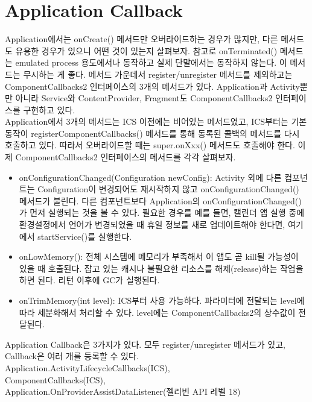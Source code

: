 \section{Application Callback}
Application에서는 onCreate() 메서드만 오버라이드하는 경우가 많지만,  
다른 메서드도 유용한 경우가 있으니 어떤 것이 있는지 살펴보자. 
참고로 onTerminated() 메서드는 emulated process 용도에서나 동작하고 실제 단말에서는 동작하지 않는다. 이 메서드는 무시하는 게 좋다.
메서드 가운데서 register/unregister 메서드를 제외하고는 ComponentCallbacks2 인터페이스의 3개의 메서드가 있다. Application과 Activity뿐만 아니라 Service와 ContentProvider, Fragment도 ComponentCallbacks2 인터페이스를 구현하고 있다.\\ 

Application에서 3개의 메서드는 ICS 이전에는 비어있는 메서드였고, ICS부터는 기본 동작이 registerComponentCallbacks() 메서드를 통해 동록된 콜백의 메서드를 다시 호출하고 있다. 따라서 오버라이드할 때는 super.onXxx() 메서드도 호출해야 한다.
이제 ComponentCallbacks2 인터페이스의 메서드를 각각 살펴보자.
\begin{itemize}
\item onConfigurationChanged(Configuration newConfig): Activity 외에 다른 컴포넌트는 Configuration이 변경되어도 재시작하지 않고 onConfigurationChanged() 메서드가 불린다. 
다른 컴포넌트보다 Application의  onConfigurationChanged()가 먼저 실행되는 것을 볼 수 있다.
필요한 경우를 예를 들면, 캘린더 앱 실행 중에 환경설정에서 언어가 변경되었을 때 휴일 정보를 새로 업데이트해야 한다면, 여기에서 startService()를 실행한다.

\item onLowMemory(): 전체 시스템에 메모리가 부족해서 이 앱도 곧 kill될 가능성이 있을 때 호출된다. 잡고 있는 캐시나 불필요한 리소스를 해제(release)하는 작업을 하면 된다. 리턴 이후에 GC가 실행된다.

\item onTrimMemory(int level): ICS부터 사용 가능하다. 파라미터에 전달되는 level에 따라 세분화해서 처리할 수 있다. level에는 ComponentCallbacks2의 상수값이 전달된다.
\end{itemize}

Application Callback은 3가지가 있다. 모두 register/unregister 메서드가 있고, Callback은 여러 개를 등록할 수 있다.\\

Application.ActivityLifecycleCallbacks(ICS), \\
ComponentCallbacks(ICS), \\
Application.OnProviderAssistDataListener(젤리빈 API 레벨 18)\\

